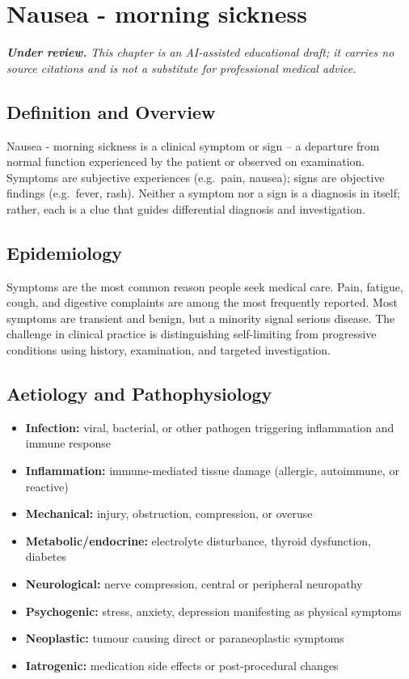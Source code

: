 \chapter{Nausea - morning sickness}

\medskip
\noindent\textit{\textbf{Under review.} This chapter is an AI-assisted educational draft; it carries no source citations and is not a substitute for professional medical advice.}

\section*{Definition and Overview}
Nausea - morning sickness is a clinical symptom or sign -- a departure from normal function experienced by the patient or observed on examination. Symptoms are subjective experiences (e.g.\ pain, nausea); signs are objective findings (e.g.\ fever, rash). Neither a symptom nor a sign is a diagnosis in itself; rather, each is a clue that guides differential diagnosis and investigation.

\section*{Epidemiology}
Symptoms are the most common reason people seek medical care. Pain, fatigue, cough, and digestive complaints are among the most frequently reported. Most symptoms are transient and benign, but a minority signal serious disease. The challenge in clinical practice is distinguishing self-limiting from progressive conditions using history, examination, and targeted investigation.

\section*{Aetiology and Pathophysiology}
\begin{itemize}
    \item \textbf{Infection:} viral, bacterial, or other pathogen triggering inflammation and immune response
    \item \textbf{Inflammation:} immune-mediated tissue damage (allergic, autoimmune, or reactive)
    \item \textbf{Mechanical:} injury, obstruction, compression, or overuse
    \item \textbf{Metabolic/endocrine:} electrolyte disturbance, thyroid dysfunction, diabetes
    \item \textbf{Neurological:} nerve compression, central or peripheral neuropathy
    \item \textbf{Psychogenic:} stress, anxiety, depression manifesting as physical symptoms
    \item \textbf{Neoplastic:} tumour causing direct or paraneoplastic symptoms
    \item \textbf{Iatrogenic:} medication side effects or post-procedural changes
\end{itemize}

